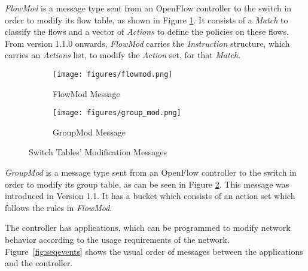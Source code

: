 \setlength{\belowcaptionskip}{0pt}
\emph{FlowMod} is a message type sent from an OpenFlow controller to the switch in order to modify its flow table, as shown in Figure \ref{fig:flowmod}. It consists of a \emph{Match} to classify the flows and a vector of \emph{Actions} to define the policies on these flows. From version 1.1.0 onwards, \emph{FlowMod} carries the \emph{Instruction} structure, which carries an \emph{Actions} list, to modify the \emph{Action} set, for that \emph{Match}.
\begin{comment}
\setlength{\belowcaptionskip}{-10pt}

\begin{figure}
\centering
\texttt{[image: figures/flowmod.png]}
\caption{FlowMod Message}
\label{fig:flowmod}
\end{figure}

\setlength{\belowcaptionskip}{0pt}
\end{comment}


\begin{figure}[!h]
    \centering
    \begin{subfigure}[b]{0.3\textwidth}
       \centering
\texttt{[image: figures/flowmod.png]}
\caption{FlowMod Message}
\label{fig:flowmod}
    \end{subfigure}
   
    \begin{subfigure}[b]{0.3\textwidth}
      \centering
\texttt{[image: figures/group\_mod.png]}
\caption{GroupMod Message}
\label{fig:groupmod}
    \end{subfigure}
    \caption{Switch Tables' Modification Messages}
    \label{fig:messagetable}
\end{figure}
\setlength{\belowcaptionskip}{-10pt}
\emph{GroupMod} is a message type sent from an OpenFlow controller to the switch in order to modify its group table, as can be seen in Figure \ref{fig:groupmod}. This message was introduced in Version 1.1. It has a bucket which consists of an action set which follows the rules in \emph{FlowMod}.  
\begin{comment}
\setlength{\belowcaptionskip}{-10pt}

\begin{figure}[h]
\centering
\texttt{[image: figures/group\_mod.png]}
\caption{GroupMod Message}
\label{fig:groupmod}
\end{figure}
\end{comment}
The controller has applications, which can be programmed to modify network behavior according to the usage requirements of the network. Figure~\ref{fig:seqevents} shows the usual order of messages between the applications and the controller.

